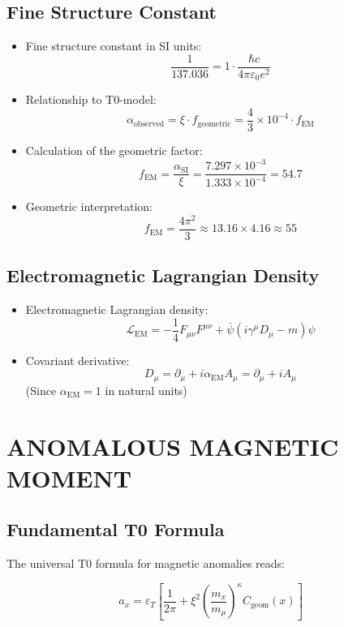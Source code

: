 \documentclass[12pt,a4paper]{article}
\begin{document}
	\subsection{Fine Structure Constant}
	\begin{itemize}
		\item Fine structure constant in SI units:
		$$\frac{1}{137.036} = 1 \cdot \frac{\hbar c}{4\pi\varepsilon_0 e^2}$$
		
		\item Relationship to T0-model:
		$$\alpha_{\text{observed}} = \xi \cdot f_{\text{geometric}} = \frac{4}{3} \times 10^{-4} \cdot f_{\text{EM}}$$
		
		\item Calculation of the geometric factor:
		$$f_{\text{EM}} = \frac{\alpha_{\text{SI}}}{\xi} = \frac{7.297 \times 10^{-3}}{1.333 \times 10^{-4}} = 54.7$$
		
		\item Geometric interpretation:
		$$f_{\text{EM}} = \frac{4\pi^2}{3} \approx 13.16 \times 4.16 \approx 55$$
	\end{itemize}
	
	\subsection{Electromagnetic Lagrangian Density}
	\begin{itemize}
		\item Electromagnetic Lagrangian density:
		$$\mathcal{L}_{\text{EM}} = -\frac{1}{4}F_{\mu\nu}F^{\mu\nu} + \bar{\psi}(i\gamma^\mu D_\mu - m)\psi$$
		
		\item Covariant derivative:
		$$D_\mu = \partial_\mu + i \alpha_{\text{EM}} A_\mu = \partial_\mu + i A_\mu$$
		(Since $\alpha_{\text{EM}} = 1$ in natural units)
	\end{itemize}
	
\section{ANOMALOUS MAGNETIC MOMENT}

\subsection{Fundamental T0 Formula}

The universal T0 formula for magnetic anomalies reads:

\begin{equation}
	\boxed{a_x = \varepsilon_T \left[ \frac{1}{2\pi} + \xi^2 \left(\frac{m_x}{m_\mu}\right)^\kappa C_{\text{geom}}(x) \right]}
\end{equation}
\end{document}
